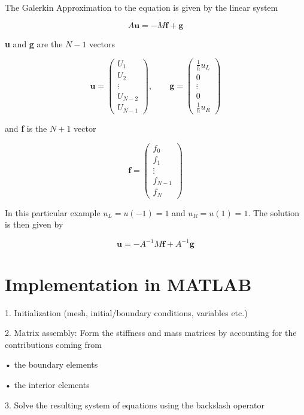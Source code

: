 \documentclass[12pt]{report}
\begin{document}
The Galerkin Approximation to the equation is given by the linear system

\begin{equation}\label{discretepde}
A\textbf{u}=-M\textbf{f}+\textbf{g}
\end{equation}

\textbf{u} and \textbf{g} are the $N-1$ vectors

\[\textbf{u} =
 \begin{pmatrix}
  U_1  \\
  U_2  \\
  \vdots  \\
  U_{N-2} \\
  U_{N-1}  
 \end{pmatrix},\qquad\textbf{g}=
 \begin{pmatrix}
  \frac{1}{h}u_L  \\
  0  \\
  \vdots  \\
  0 \\ 
  \frac{1}{h}u_{R}  
 \end{pmatrix}
\]

and \textbf{f} is the $N+1$ vector

\[\textbf{f} =
 \begin{pmatrix}
  f_0  \\
  f_1  \\
  \vdots  \\
  f_{N-1} \\
  f_{N}  
 \end{pmatrix}
 \]
 
In this particular example $u_L=u(-1)=1$ and $u_R=u(1)=1$. The solution is then given by

\begin{equation}\label{discreteu}
\textbf{u}=-A^{-1}M\textbf{f}+A^{-1}\textbf{g}
\end{equation}

\section*{Implementation in MATLAB}


\begin{tcolorbox}[title=Implementating FEM in MATLAB]
1. Initialization (mesh, initial/boundary conditions, variables etc.)


2. Matrix assembly: Form the stiffness and mass matrices by accounting for the contributions coming from

\quad• the boundary elements

\quad• the interior elements

3. Solve the resulting system of equations using the backslash operator
\end{tcolorbox}
\end{document}
